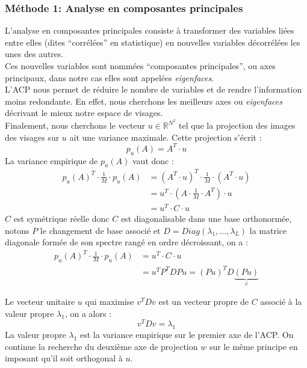 \documentclass[12pt,french]{article}
\theoremstyle{plain}
\theoremstyle{definition}
\begin{document}
\subsubsection{Méthode 1: Analyse en composantes principales}
L'analyse en composantes principales consiste à transformer des variables liées entre elles (dites ``corrélées'' en statistique) en nouvelles variables décorrélées les unes des autres.\\
Ces nouvelles variables sont nommées ``composantes principales'', ou axes principaux, dans notre cas elles sont appelées \emph{eigenfaces}.\\
L'ACP nous permet de réduire le nombre de variables et de rendre l'information moins redondante. En effet, nous cherchons les meilleurs axes ou \emph{eigenfaces} décrivant le mieux notre espace de visages.\\

Finalement, nous cherchons le vecteur $u \in \mathbb{R}^{N^2}$ tel que la projection des images des visages sur $u$ ait une variance maximale. Cette projection s'écrit :
\[
  p_u(A)=A^T \cdot u
\]
La variance empirique de $p_u(A)$ vaut donc :
\begin{align*}
  p_u(A)^T \cdot \frac{1}{M} \cdot p_u(A) &= (A^T \cdot u)^T \cdot \frac{1}{M} \cdot (A^T \cdot u)\\
                                          &= u^T \cdot \left( A \cdot \frac{1}{M} \cdot A^T \right) \cdot u\\
                                          &= u^T \cdot C \cdot u
\end{align*}
$C$ est symétrique réelle donc $C$ est diagonalisable dans une base orthonormée,
notons $P$ le changement de base associé et $D = Diag(\lambda_1, \dotsc, \lambda_L)$ la matrice diagonale formée de son spectre rangé en ordre décroissant, on a :
\begin{align*}
  p_u(A)^T \cdot \frac{1}{M} \cdot p_u(A) &= u^T \cdot C \cdot u\\
                                          &= u^T P^T D P u = (Pu)^T D \underbrace{(Pu)}_v
\end{align*}

Le vecteur unitaire $u$ qui maximise $v^T D v$  est un vecteur propre de $C$ associé à la valeur propre $\lambda_1$, on a alors :
\[
  v^T D v = \lambda_1
\]
La valeur propre $\lambda_1$ est la variance empirique sur le premier axe de l'ACP.
On continue la recherche du deuxième axe de projection $w$ sur le même principe en imposant qu'il soit orthogonal à $u$.\\
\end{document}
